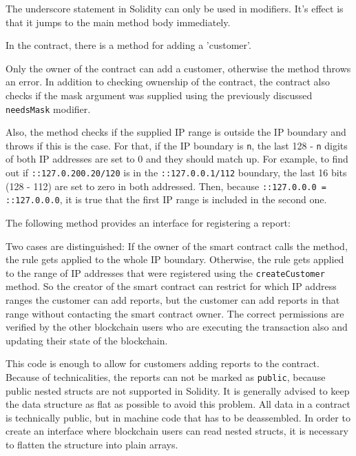 The underscore statement in Solidity can only be used in modifiers. It's effect is that it jumps to the main method body immediately.

In the contract, there is a method for adding a 'customer'.



Only the owner of the contract can add a customer, otherwise the method throws an error. In addition to checking ownership of the contract, the contract also checks if the mask argument was supplied using the previously discussed \texttt{needsMask} modifier.

Also, the method checks if the supplied IP range is outside the IP boundary and throws if this is the case. For that, if the IP boundary is \texttt{n}, the last 128 - \texttt{n} digits of both IP addresses are set to 0 and they should match up. For example, to find out if \texttt{::127.0.200.20/120} is in the \texttt{::127.0.0.1/112} boundary, the last 16 bits (128 - 112) are set to zero in both addressed. Then, because \texttt{::127.0.0.0 = ::127.0.0.0}, it is true that the first IP range is included in the second one.

The following method provides an interface for registering a report:



Two cases are distinguished: If the owner of the smart contract calls the method, the rule gets applied to the whole IP boundary. Otherwise, the rule gets applied to the range of IP addresses that were registered using the \texttt{createCustomer} method. So the creator of the smart contract can restrict for which IP address ranges the customer can add reports, but the customer can add reports in that range without contacting the smart contract owner. The correct permissions are verified by the other blockchain users who are executing the transaction also and updating their state of the blockchain.

This code is enough to allow for customers adding reports to the contract. Because of technicalities, the reports can not be marked as \texttt{public}, because public nested structs are not supported in Solidity. It is generally advised to keep the data structure as flat as possible to avoid this problem.
All data in a contract is technically public, but in machine code that has to be deassembled. In order to create an interface where blockchain users can read nested structs, it is necessary to flatten the structure into plain arrays.

